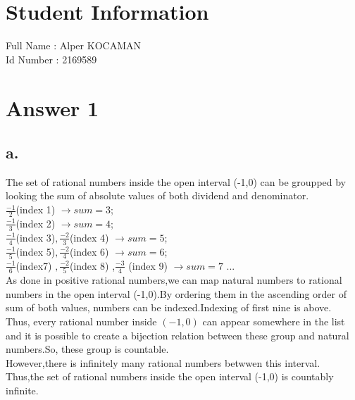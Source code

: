 \documentclass[12pt]{article}
\begin{document}
\section*{Student Information } 
Full Name : Alper KOCAMAN\\
Id Number : 2169589 \\

\section*{Answer 1}

\subsection*{a.}

The set of rational numbers inside the open interval (-1,0) can be groupped by looking the sum of absolute values of both dividend and denominator.\\
$\frac{-1}{2} $(index 1) $\rightarrow sum=3$; \\
$\frac{-1}{3} $(index 2) $\rightarrow sum=4$; \\ 
$\frac{-1}{4} $(index 3)$ ,\frac{-2}{3} $(index 4)  $\rightarrow sum=5$; \\
$\frac{-1}{5} $(index 5)$ ,\frac{-2}{4} $(index 6)  $\rightarrow sum=6$; \\ 
$\frac{-1}{6} $(index7)  $,\frac{-2}{5} $(index 8)  ,$\frac{-3}{4}$ (index 9)  $\rightarrow sum=7$ ...\\

As done in positive rational numbers,we can map natural numbers to rational numbers in the open interval (-1,0).By ordering them in the ascending order of sum of both values, numbers can be indexed.Indexing of first nine is above.\\

Thus, every rational number inside $(-1,0)$ can appear somewhere in the list and it is possible to create a bijection relation between these group and natural numbers.So, these group is countable.\\

However,there is infinitely many rational numbers betwwen this interval.\\

Thus,the set of rational numbers inside the open interval (-1,0) is countably infinite.\\
\end{document}
